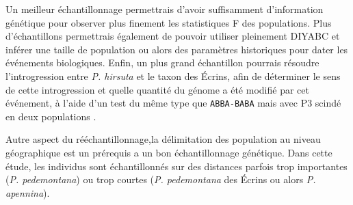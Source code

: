 Un meilleur échantillonnage permettrais d'avoir suffisamment d'information génétique pour observer plus finement les statistiques F des populations.
 Plus d'échantillons permettrais également de pouvoir utiliser pleinement DIYABC et inférer une taille de population ou alors des paramètres historiques pour dater les événements biologiques.
 Enfin, un plus grand échantillon pourrais résoudre l'introgression entre \textit{P. hirsuta} et le taxon des Écrins, afin de déterminer le sens de cette introgression et quelle quantité du génome a été modifié par cet événement, à l'aide d'un test du même type que \verb|ABBA-BABA| mais avec P3 scindé en deux populations \citep{Eaton2015}. 

Autre aspect du rééchantillonnage,la délimitation des population au niveau géographique est un prérequis a un bon échantillonnage génétique.
 Dans cette étude, les individus sont échantillonnés sur des distances parfois trop importantes (\textit{P. pedemontana}) ou trop courtes (\textit{P. pedemontana} des Écrins ou alors \textit{P. apennina}).

